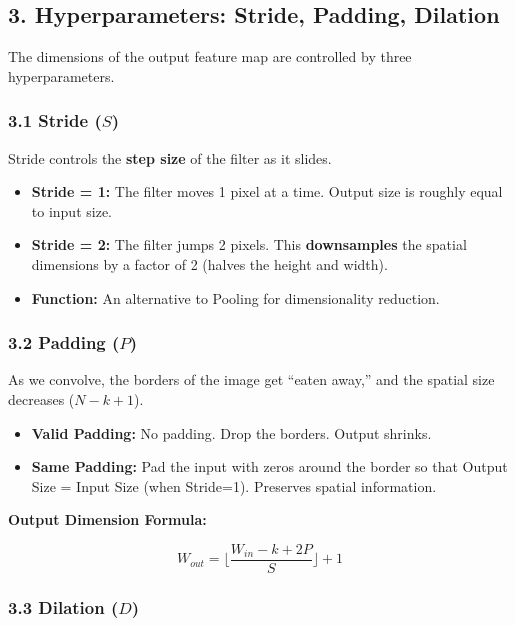 \documentclass[
  italian,
  11pt,
]{article}
\begin{document}
\subsection{3. Hyperparameters: Stride, Padding,
Dilation}\label{hyperparameters-stride-padding-dilation}

The dimensions of the output feature map are controlled by three
hyperparameters.

\subsubsection{\texorpdfstring{3.1 Stride
(\(S\))}{3.1 Stride (S)}}\label{stride-s}

Stride controls the \textbf{step size} of the filter as it slides.

\begin{itemize}
\item
  \textbf{Stride = 1:} The filter moves 1 pixel at a time. Output size
  is roughly equal to input size.
\item
  \textbf{Stride = 2:} The filter jumps 2 pixels. This
  \textbf{downsamples} the spatial dimensions by a factor of 2 (halves
  the height and width).
\item
  \textbf{Function:} An alternative to Pooling for dimensionality
  reduction.
\end{itemize}

\subsubsection{\texorpdfstring{3.2 Padding
(\(P\))}{3.2 Padding (P)}}\label{padding-p}

As we convolve, the borders of the image get ``eaten away,'' and the
spatial size decreases (\(N - k + 1\)).

\begin{itemize}
\item
  \textbf{Valid Padding:} No padding. Drop the borders. Output shrinks.
\item
  \textbf{Same Padding:} Pad the input with zeros around the border so
  that Output Size = Input Size (when Stride=1). Preserves spatial
  information.
\end{itemize}

\textbf{Output Dimension Formula:}

\[W_{out} = \lfloor \frac{W_{in} - k + 2P}{S} \rfloor + 1\]

\subsubsection{\texorpdfstring{3.3 Dilation
(\(D\))}{3.3 Dilation (D)}}\label{dilation-d}
\end{document}
